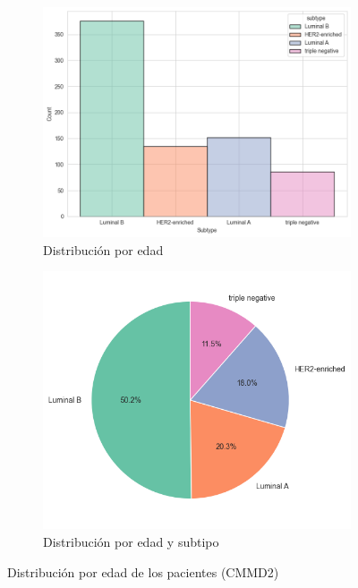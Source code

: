 \documentclass[a4paper,10pt]{book}
\begin{document}
\begin{figure}[h!]
    \centering
    \begin{subfigure}[c]{0.45\textwidth}
        \centering
        \includegraphics[width=\textwidth]{reports//assets/subtype_hist.png}
        \caption{Distribución por edad}
        \label{fig:subtype_hist}
    \end{subfigure}
    \begin{subfigure}[c]{0.45\textwidth}
        \centering
        \includegraphics[width=\textwidth]{reports/assets/subtype_pie.png}
        \caption{Distribución por edad y subtipo}
        \label{fig:subtype_pie}
    \end{subfigure}
    \caption{Distribución por edad de los pacientes (CMMD2)}
    \label{fig:subtype_charts}
\end{figure}
\end{document}
